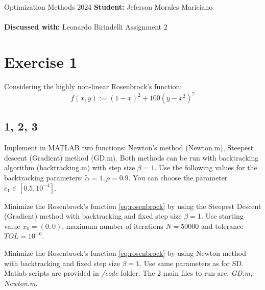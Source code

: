 \documentclass[unicode,11pt,a4paper,oneside,numbers=endperiod,openany]{scrartcl}
\begin{document}
\setassignment
{}

\serieheader
{Optimization Methods}
{2024}
{\textbf{Student:} Jeferson Morales Mariciano \\\\}
{\textbf{Discussed with:} Leonardo Birindelli}
{Assignment 2}{}
\newline



\section*{Exercise 1}
Considering the highly non-linear Rosenbrock's function:
\begin{equation} \label{eq:rosenbrock}
    f(x, y) := (1 - x)^2 + 100(y - x^2)^2 
\end{equation}

\subsection*{1, 2, 3}
Implement in MATLAB two functions: 
Newton's method (Newton.m), Steepest descent (Gradient) method (GD.m).
Both methods can be run with backtracking algorithm (backtracking.m) with step size $\beta = 1$. 
Use the following values for the backtracking parameters: 
$\tilde{\alpha} = 1, \rho = 0.9$. 
You can choose the parameter $c_1 \in [0.5, 10^{-4}]$.

Minimize the Rosenbrock's function \ref{eq:rosenbrock} 
by using the Steepest Descent (Gradient) method with backtracking and fixed step size $\beta = 1$. 
Use starting value $x_0 = (0, 0)$, 
maximum number of iterations $N = 50000$ and tolerance $TOL = 10^{-6}$.

Minimize the Rosenbrock's function \ref{eq:rosenbrock} 
by using Newton method with backtracking and fixed step size $\beta = 1$. 
Use same parameters as for SD.
\\\newline
Matlab scripts are provided in \textit{/code} folder.
The 2 main files to run are: \textit{GD.m, Newton.m}.
\end{document}
